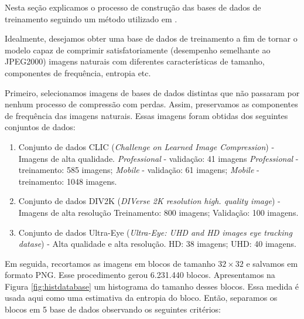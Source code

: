 Nesta seção explicamos o processo de construção das bases de dados de treinamento seguindo um método utilizado em \cite{DeliverableJuly}.


Idealmente, desejamos obter uma base de dados de treinamento a fim de tornar o modelo capaz de comprimir satisfatoriamente (desempenho semelhante ao JPEG2000) imagens naturais com diferentes características de tamanho, componentes de frequência, entropia etc. 

Primeiro, selecionamos imagens de bases de dados distintas que não passaram por nenhum processo de compressão com perdas. Assim, preservamos as componentes de frequência das imagens naturais. Essas imagens foram obtidas dos seguintes conjuntos de dados:

\begin{enumerate}
	\item Conjunto de dados CLIC \cite{bib:clic} (\textit{Challenge on Learned Image Compression}) - Imagens de alta qualidade.
	\subitem \textit{Professional} - validação: 41 imagens
	\subitem \textit{Professional} - treinamento: 585 imagens;
	\subitem \textit{Mobile} - validação: 61 imagens;
	\subitem \textit{Mobile} - treinamento: 1048 imagens.
	\item Conjunto de dados DIV2K \cite{bib:div2k} (\textit{DIVerse 2K resolution high.
		quality image}) - Imagens de alta resolução
	\subitem Treinamento: 800 imagens;
	\subitem Validação: 100 imagens.
	\item Conjunto de dados Ultra-Eye \cite{bib:ultraeye} (\textit{Ultra-Eye: UHD and HD images eye tracking datase}) - Alta qualidade e alta resolução.
	\subitem HD: 38 imagens;
	\subitem UHD: 40 imagens.
\end{enumerate}


Em seguida, recortamos as imagens em blocos de tamanho $32 \times 32$ e salvamos em formato PNG. Esse procedimento gerou 6.231.440 blocos. Apresentamos na Figura \ref{fig:histdatabase} um histograma do tamanho desses blocos. Essa medida é usada aqui como uma estimativa da entropia do bloco. Então, separamos os blocos em 5 base de dados observando os seguintes critérios:


